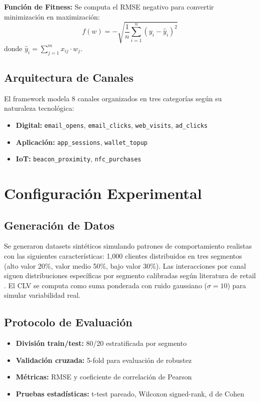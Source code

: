 \documentclass[conference]{IEEEtran}
\begin{document}
\textbf{Función de Fitness:} Se computa el RMSE negativo para convertir minimización en maximización:
\begin{equation}
f(w) = -\sqrt{\frac{1}{n}\sum_{i=1}^{n}(y_i - \hat{y}_i)^2}
\end{equation}
donde $\hat{y}_i = \sum_{j=1}^{m} x_{ij} \cdot w_j$.

\subsection{Arquitectura de Canales}
El framework modela 8 canales organizados en tres categorías según su naturaleza tecnológica:
\begin{itemize}
    \item \textbf{Digital:} \texttt{email\_opens}, \texttt{email\_clicks}, \texttt{web\_visits}, \texttt{ad\_clicks}
    \item \textbf{Aplicación:} \texttt{app\_sessions}, \texttt{wallet\_topup}
    \item \textbf{IoT:} \texttt{beacon\_proximity}, \texttt{nfc\_purchases}
\end{itemize}

\section{Configuración Experimental}

\subsection{Generación de Datos}
Se generaron datasets sintéticos simulando patrones de comportamiento realistas con las siguientes características: 1,000 clientes distribuidos en tres segmentos (alto valor 20\%, valor medio 50\%, bajo valor 30\%). Las interacciones por canal siguen distribuciones específicas por segmento calibradas según literatura de retail \cite{verhoef2015}. El CLV se computa como suma ponderada con ruido gaussiano ($\sigma=10$) para simular variabilidad real.

\subsection{Protocolo de Evaluación}
\begin{itemize}
    \item \textbf{División train/test:} 80/20 estratificada por segmento
    \item \textbf{Validación cruzada:} 5-fold para evaluación de robustez
    \item \textbf{Métricas:} RMSE y coeficiente de correlación de Pearson
    \item \textbf{Pruebas estadísticas:} t-test pareado, Wilcoxon signed-rank, d de Cohen
\end{itemize}
\end{document}
